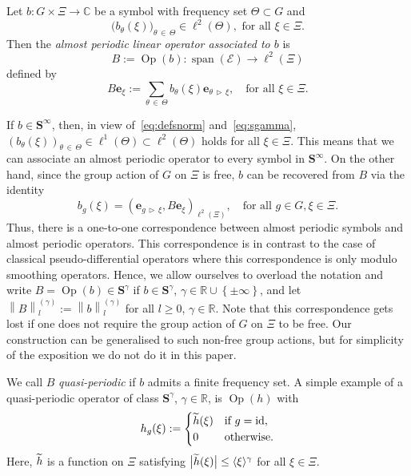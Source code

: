 \documentclass[AHL,Unicode,longabstracts,published]{cedram}
\DeclareMathOperator{\spann}{span}
\DeclareMathOperator{\Op}{Op}
\DeclareMathOperator{\id}{id}
\newcommand{\R}{\mathbb R}
\newcommand{\C}{\mathbb C}
\newcommand{\CE}{\mathcal{E}}
\newcommand{\BS}{\mathbf S}
\newcommand{\be}{\mathbf e}
\newcommand{\act}{\triangleright}
\renewcommand{\subseteq}{\subset}
\newcommand{\set}[1]{\left\{ #1 \right\}}
\newcommand{\snorm}[3]{\left\| #1\right\|_{#3}^{(#2)}}
\newcommand{\ang}[1]{\langle #1 \rangle}
\let\oldtilde\tilde
\renewcommand*{\tilde}[1]{\mathchoice{\widetilde{#1}}{\widetilde{#1}}{\oldtilde{#1}}{\oldtilde{#1}}}
\begin{document}
\begin{defi}
Let $b:G\times\Xi\to\C$ be a symbol with frequency set $\Theta\subseteq G$ and
\begin{equation}
\big(b_{\theta}(\xi)\big)_{\theta\,\in\,\Theta}\in \ell^2(\Theta), \text{ for all } \xi\in\Xi.
\end{equation}
Then the \emph{almost periodic linear operator associated to $b$} is
\begin{equation}
B:= \Op(b):\spann(\CE)\to \ell^2(\Xi)
\end{equation}
defined by
\begin{equation}\label{eq:defopB}
B \be_\xi := \sum_{\theta\,\in\,\Theta} b_\theta(\xi) \be_{\theta\,\act\,\xi}, \quad\text{for all }
\xi\in\Xi.
\end{equation}
\end{defi}

\begin{rema}
If $b\in\BS^\infty$, then, in view of~\eqref{eq:defsnorm} and~\eqref{eq:sgamma}, $(b_{\theta}(\xi))_{\theta\,\in\,\Theta}\in \ell^1(\Theta)\subseteq
\ell^2(\Theta)$ holds for all $\xi\in\Xi$. This means that we can associate an almost periodic operator to every symbol in $\BS^\infty$. On the other hand, since the group action of $G$ on $\Xi$ is free, $b$ can be recovered from $B$ via the identity
\begin{equation}\label{eq:symbrecovery}
b_g(\xi)=\left(\be_{g\,\act\,\xi},B\be_\xi\right)_{\ell^2(\Xi)}, \quad\text{for all }g\in G , \xi\in\Xi.
\end{equation}
Thus, there is a one-to-one correspondence between almost periodic symbols and almost periodic operators. This correspondence is in contrast to the case of classical pseudo-differential operators where this correspondence is only modulo smoothing operators. Hence, we allow ourselves to overload the notation and write $B = \Op(b) \in \BS^\gamma$ if $b \in \BS^\gamma$, $\gamma \in \R \cup \set{\pm \infty}$, and let $\snorm B \gamma l := \snorm b
\gamma l$ for all $l \ge 0$, $\gamma \in \R$. Note that this correspondence gets lost if one does not require the group action of $G$ on $\Xi$ to be free. Our construction can be generalised to such non-free group actions, but for simplicity of the exposition we do not do it in this paper.
\end{rema}

We call $B$ \emph{quasi-periodic} if $b$ admits a finite frequency set. A simple example of a quasi-periodic operator of class $\BS^\gamma$, $\gamma\in\R$, is $\Op(h)$ with
\[
h_g(\xi):=
\begin{cases}
\tilde h(\xi) & \text{if } g = \id, \\ 0
&\text{otherwise.}
\end{cases}
\]
Here, $\tilde h$ is a function on $\Xi$ satisfying $\big|\tilde h(\xi)\big| \leq\ang\xi^\gamma$ for all $\xi\in\Xi$.
\end{document}
